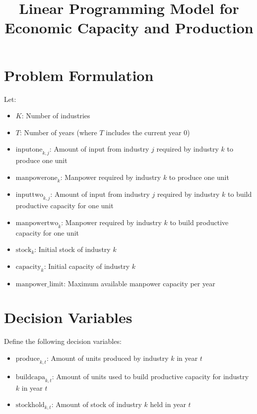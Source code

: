 \documentclass{article}
\begin{document}
\title{Linear Programming Model for Economic Capacity and Production}
\author{}
\date{}
\maketitle

\section*{Problem Formulation}

Let:
\begin{itemize}
    \item \( K \): Number of industries
    \item \( T \): Number of years (where \( T \) includes the current year \( 0 \))
    \item \( \text{inputone}_{k,j} \): Amount of input from industry \( j \) required by industry \( k \) to produce one unit
    \item \( \text{manpowerone}_{k} \): Manpower required by industry \( k \) to produce one unit
    \item \( \text{inputtwo}_{k,j} \): Amount of input from industry \( j \) required by industry \( k \) to build productive capacity for one unit
    \item \( \text{manpowertwo}_{k} \): Manpower required by industry \( k \) to build productive capacity for one unit
    \item \( \text{stock}_{k} \): Initial stock of industry \( k \)
    \item \( \text{capacity}_{k} \): Initial capacity of industry \( k \)
    \item \( \text{manpower\_limit} \): Maximum available manpower capacity per year
\end{itemize}

\section*{Decision Variables}
Define the following decision variables:
\begin{itemize}
    \item \( \text{produce}_{k,t} \): Amount of units produced by industry \( k \) in year \( t \)
    \item \( \text{buildcapa}_{k,t} \): Amount of units used to build productive capacity for industry \( k \) in year \( t \)
    \item \( \text{stockhold}_{k,t} \): Amount of stock of industry \( k \) held in year \( t \)
\end{itemize}
\end{document}
